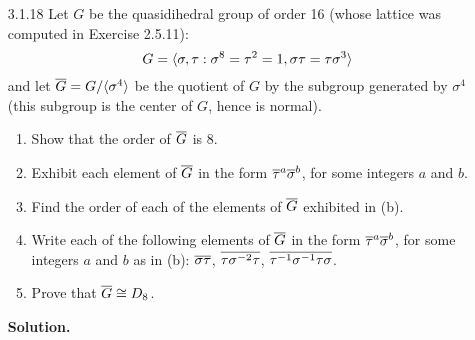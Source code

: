 \begin{enumerate}
\begin{enumerate}
               appropriate integers $a$ and $b$, it follows that
               $$X = \cyc{x, y : x^4 = y^2 = 1, yx = x^{-1}y} \cong D_8.$$
         \item By Exercise 2.2.7(b), $Z(D_8) = \cyc{r^2}$. Thus since
               $\m{G} \cong D_8$ (see (b)), it follows that
               $Z(\m{G}) = \cyc{\m{r}^2}$. Thus
               $$\m{G}/Z(\m{G}) = \{Z(\m{G}), \m{r}Z(\m{G}), \m{s}Z(\m{G}),
                 \m{sr}Z(\m{G})\}.$$
               The order of each nonidentity element in the preceding set is 2;
               conclude by Exercise 2.5.10 that $\m{G}/Z(\m{G})$ is isomorphic
               to the Klein 4-group.
               \qed
      \end{enumerate}
   \item[3.1.18]  Let $G$ be the quasidihedral group of order 16 (whose lattice
                  was computed in Exercise 2.5.11):
                  $$G = \langle \sigma, \tau : \sigma^8 = \tau^2 = 1,
                             \sigma\tau = \tau\sigma^3 \rangle$$
                  and let $\overline{G} = G/\langle \sigma^4 \rangle$ be the quotient of $G$ by
                  the subgroup generated by $\sigma^4$ (this subgroup is the
                  center of $G$, hence is normal).
                  \begin{enumerate}
                     \item Show that the order of $\overline{G}$ is 8.
                     \item Exhibit each element of $\overline{G}$ in the form
                           $\overline{\tau}^a\overline{\sigma}^b$, for some integers $a$ and
                           $b$.
                     \item Find the order of each of the elements of $\overline{G}$
                           exhibited in (b).
                     \item Write each of the following elements of $\overline{G}$ in
                           the form $\overline{\tau}^a\overline{\sigma}^b$, for some integers
                           $a$ and $b$ as in (b): \quad $\overline{\sigma\tau}$, \quad
                           $\overline{\tau\sigma^{-2}\tau}$, \quad
                           $\overline{\tau^{-1}\sigma^{-1}\tau\sigma}$.
                     \item Prove that $\m{G} \cong D_8$.
                  \end{enumerate}

      \textbf{Solution.}


\end{enumerate}

